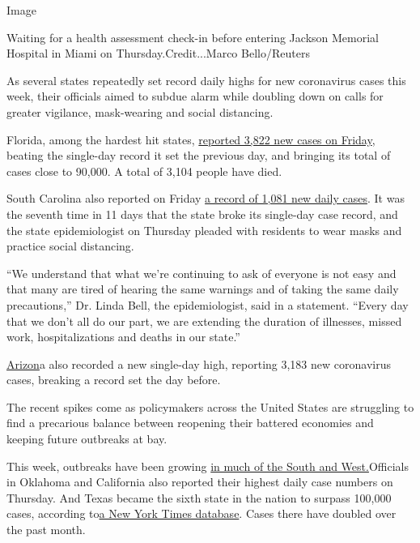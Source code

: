 Image

Waiting for a health assessment check-in before entering Jackson
Memorial Hospital in Miami on Thursday.Credit...Marco Bello/Reuters

As several states repeatedly set record daily highs for new coronavirus
cases this week, their officials aimed to subdue alarm while doubling
down on calls for greater vigilance, mask-wearing and social distancing.

Florida, among the hardest hit states,
\href{https://fdoh.maps.arcgis.com/apps/opsdashboard/index.html\#/8d0de33f260d444c852a615dc7837c86}{reported
3,822 new cases on Friday}, beating the single-day record it set the
previous day, and bringing its total of cases close to 90,000. A total
of 3,104 people have died.

South Carolina also reported on Friday
\href{https://www.scdhec.gov/infectious-diseases/viruses/coronavirus-disease-2019-covid-19/sc-testing-data-projections-covid-19}{a
record of 1,081 new daily cases}. It was the seventh time in 11 days
that the state broke its single-day case record, and the state
epidemiologist on Thursday pleaded with residents to wear masks and
practice social distancing.

``We understand that what we're continuing to ask of everyone is not
easy and that many are tired of hearing the same warnings and of taking
the same daily precautions,'' Dr. Linda Bell, the epidemiologist, said
in a statement. ``Every day that we don't all do our part, we are
extending the duration of illnesses, missed work, hospitalizations and
deaths in our state.''

\href{https://www.nytimes.com/2020/06/18/us/coronavirus-arizona-stay-at-home-mark-lamb.html}{Arizon}a
also recorded a new single-day high, reporting 3,183 new coronavirus
cases, breaking a record set the day before.

The recent spikes come as policymakers across the United States are
struggling to find a precarious balance between reopening their battered
economies and keeping future outbreaks at bay.

This week, outbreaks have been growing
\href{https://www.nytimes.com/2020/06/14/us/coronavirus-united-states.html}{in
much of the South and West.}Officials in Oklahoma and California also
reported their highest daily case numbers on Thursday. And Texas became
the sixth state in the nation to surpass 100,000 cases, according
to\href{https://www.nytimes.com/interactive/2020/us/texas-coronavirus-cases.html}{a
New York Times database}. Cases there have doubled over the past month.


